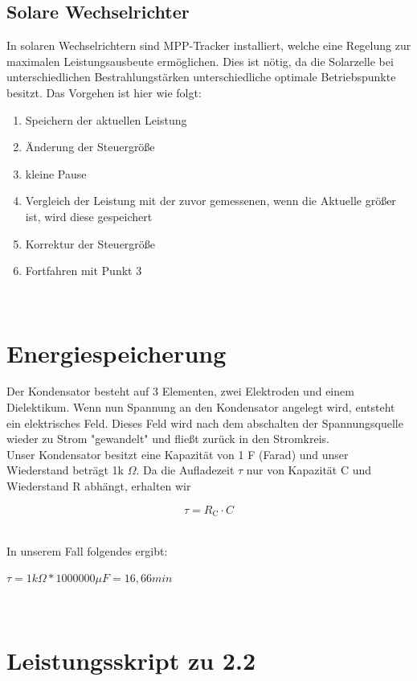 \documentclass[a4paper,12pt]{article}
\begin{document}
\subsection{Solare Wechselrichter}
In solaren Wechselrichtern sind MPP-Tracker installiert, welche eine Regelung zur maximalen Leistungsausbeute ermöglichen. Dies ist nötig, da die Solarzelle bei unterschiedlichen Bestrahlungstärken unterschiedliche optimale Betriebspunkte besitzt.
Das Vorgehen ist hier wie folgt:
\begin{enumerate}
 \item Speichern der aktuellen Leistung
 \item Änderung der Steuergröße
 \item kleine Pause
 \item Vergleich der Leistung mit der zuvor gemessenen, wenn die Aktuelle größer ist, wird diese gespeichert
 \item Korrektur der Steuergröße
 \item Fortfahren mit Punkt 3
\end{enumerate}
~\cite{MPPT}

\section{Energiespeicherung}
Der Kondensator besteht auf 3 Elementen, zwei Elektroden und einem Dielektikum. Wenn nun Spannung an den Kondensator angelegt wird, entsteht ein elektrisches Feld. Dieses Feld wird nach dem abschalten der Spannungsquelle wieder zu Strom "gewandelt" und fließt zurück in den Stromkreis. \\
Unser Kondensator besitzt eine Kapazität von 1 F (Farad) und unser Wiederstand beträgt 1k $\Omega$. Da die Aufladezeit $\tau$ nur von Kapazität C und Wiederstand R abhängt, erhalten wir\\
\large \begin{center}
       $$ \tau = R_{\mathrm{C}} \cdot C $$ \end{center}\\
\normalsize In unserem Fall folgendes ergibt:\newline
\large \begin{center}$ \tau = 1 k \Omega * 1000000 \mu F  = 16,66 min$\end{center}\\




\appendix
\section{Leistungsskript zu 2.2}

\end{document}

